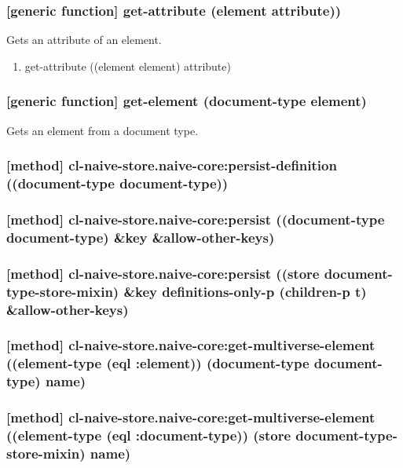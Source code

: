 \documentclass[11pt]{article}
\begin{document}
\subsubsection{[generic function] get-attribute (element attribute))}
\label{sec:org8c22b8c}

Gets an attribute of an element.

\begin{enumerate}
\item get-attribute ((element element) attribute)
\label{sec:orge01a8f2}
\end{enumerate}

\subsubsection{[generic function] get-element (document-type element)}
\label{sec:org64ee0e7}

Gets an element from a document type.

\subsubsection{[method] cl-naive-store.naive-core:persist-definition ((document-type document-type))}
\label{sec:orgc8a70b7}

\subsubsection{[method] cl-naive-store.naive-core:persist ((document-type document-type) \&key \&allow-other-keys)}
\label{sec:org2ccd870}

\subsubsection{[method] cl-naive-store.naive-core:persist ((store document-type-store-mixin) \&key definitions-only-p (children-p t) \&allow-other-keys)}
\label{sec:org44ba678}

\subsubsection{[method] cl-naive-store.naive-core:get-multiverse-element ((element-type (eql :element)) (document-type document-type) name)}
\label{sec:org212391f}

\subsubsection{[method] cl-naive-store.naive-core:get-multiverse-element ((element-type (eql :document-type)) (store document-type-store-mixin) name)}
\label{sec:orgbb2fa24}
\end{document}
